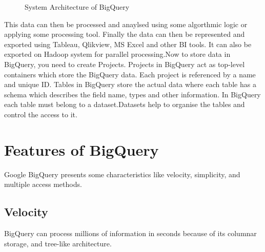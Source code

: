 \documentclass[9pt,twocolumn,twoside]{../../styles/osajnl}
\begin{document}
\begin{figure}[htbp]
\centering
{}
\caption{\cite{www-bigquery-slideshare} System Architecture of
  BigQuery}
\label{fig:architecture}
\end{figure}

\noindent
This data can then be processed and anaylsed using some algorthmic
logic or applying some processing tool. Finally the data can then be
represented and exported using Tableau\cite{www-tableau},
Qlikview\cite{www-qlik}, MS Excel\cite{www-excel} and other BI
tools. It can also be exported on Hadoop system for parallel
processing.\newline Now to store data in BigQuery, you need to create
Projects. Projects\cite{www-bigquery-documentation} in BigQuery act as
top-level containers which store the BigQuery data. Each project is
referenced by a name and unique ID. Tables in BigQuery store the
actual data where each table has a schema which describes the field
name, types and other information. In BigQuery each table must belong
to a dataset.Datasets help to organise the tables and control the
access to it.

\noindent

\section{Features of BigQuery}
Google BigQuery presents some characteristics like velocity,
simplicity, and multiple access methods.

\subsection{Velocity}

BigQuery can process millions of information in seconds because of its
columnar storage, and tree-like architecture.
\end{document}

